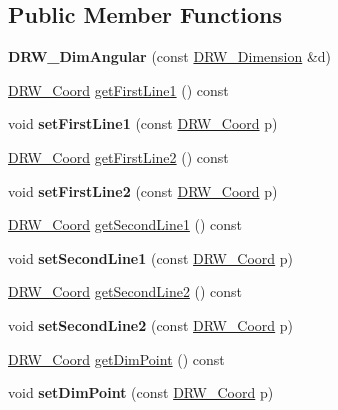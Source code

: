 \subsection*{Public Member Functions}
\begin{DoxyCompactItemize}
\item 
\hypertarget{classDRW__DimAngular_a58dfc44e60d4fa0d5b7dddd7fd4d2017}{{\bfseries D\-R\-W\-\_\-\-Dim\-Angular} (const \hyperlink{classDRW__Dimension}{D\-R\-W\-\_\-\-Dimension} \&d)}\label{classDRW__DimAngular_a58dfc44e60d4fa0d5b7dddd7fd4d2017}

\item 
\hyperlink{classDRW__Coord}{D\-R\-W\-\_\-\-Coord} \hyperlink{classDRW__DimAngular_a19fd08973bf1c998d9c8d2ddec103d79}{get\-First\-Line1} () const 
\item 
\hypertarget{classDRW__DimAngular_a5890e6bd700f00e9274ce1f811a8dba6}{void {\bfseries set\-First\-Line1} (const \hyperlink{classDRW__Coord}{D\-R\-W\-\_\-\-Coord} p)}\label{classDRW__DimAngular_a5890e6bd700f00e9274ce1f811a8dba6}

\item 
\hyperlink{classDRW__Coord}{D\-R\-W\-\_\-\-Coord} \hyperlink{classDRW__DimAngular_a7051a60adc2f98313877075088940c6b}{get\-First\-Line2} () const 
\item 
\hypertarget{classDRW__DimAngular_ac670e519bfd3d6e62076281304720ef3}{void {\bfseries set\-First\-Line2} (const \hyperlink{classDRW__Coord}{D\-R\-W\-\_\-\-Coord} p)}\label{classDRW__DimAngular_ac670e519bfd3d6e62076281304720ef3}

\item 
\hyperlink{classDRW__Coord}{D\-R\-W\-\_\-\-Coord} \hyperlink{classDRW__DimAngular_a1733492e6857d946b5c9b1945b87227f}{get\-Second\-Line1} () const 
\item 
\hypertarget{classDRW__DimAngular_acc986b12966bfc60198180eda4a1e5e5}{void {\bfseries set\-Second\-Line1} (const \hyperlink{classDRW__Coord}{D\-R\-W\-\_\-\-Coord} p)}\label{classDRW__DimAngular_acc986b12966bfc60198180eda4a1e5e5}

\item 
\hyperlink{classDRW__Coord}{D\-R\-W\-\_\-\-Coord} \hyperlink{classDRW__DimAngular_aa242db6a477a20bb091bd3f2155b82f5}{get\-Second\-Line2} () const 
\item 
\hypertarget{classDRW__DimAngular_afa2297b863a775f2b4b485799d44c318}{void {\bfseries set\-Second\-Line2} (const \hyperlink{classDRW__Coord}{D\-R\-W\-\_\-\-Coord} p)}\label{classDRW__DimAngular_afa2297b863a775f2b4b485799d44c318}

\item 
\hyperlink{classDRW__Coord}{D\-R\-W\-\_\-\-Coord} \hyperlink{classDRW__DimAngular_a88ffb9c391ee06de48555a8defbbe732}{get\-Dim\-Point} () const 
\item 
\hypertarget{classDRW__DimAngular_afecd7aa1c9433f5f2dec68a5024e0868}{void {\bfseries set\-Dim\-Point} (const \hyperlink{classDRW__Coord}{D\-R\-W\-\_\-\-Coord} p)}\label{classDRW__DimAngular_afecd7aa1c9433f5f2dec68a5024e0868}

\end{DoxyCompactItemize}

